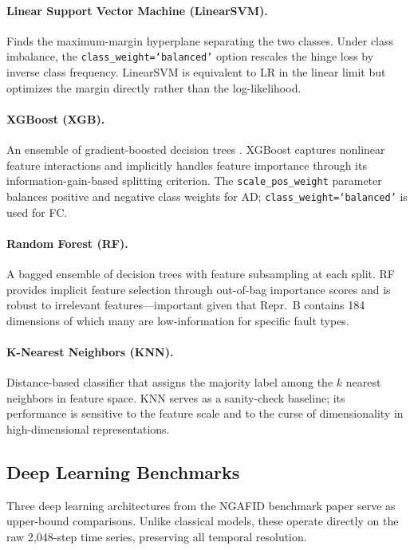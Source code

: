 \paragraph{Linear Support Vector Machine (LinearSVM).}
Finds the maximum-margin hyperplane separating the two classes. Under class
imbalance, the \texttt{class\_weight=`balanced'} option rescales the hinge loss
by inverse class frequency. LinearSVM is equivalent to LR in the linear limit but
optimizes the margin directly rather than the log-likelihood.

\paragraph{XGBoost (XGB).}
An ensemble of gradient-boosted decision trees \cite{xgboost2016}. XGBoost
captures nonlinear feature interactions and implicitly handles feature
importance through its information-gain-based splitting criterion. The
\texttt{scale\_pos\_weight} parameter balances positive and negative class
weights for AD; \texttt{class\_weight=`balanced'} is used for FC.

\paragraph{Random Forest (RF).}
A bagged ensemble of decision trees with feature subsampling at each split.
RF provides implicit feature selection through out-of-bag importance scores
and is robust to irrelevant features---important given that Repr.~B contains
184 dimensions of which many are low-information for specific fault types.

\paragraph{K-Nearest Neighbors (KNN).}
Distance-based classifier that assigns the majority label among the $k$ nearest
neighbors in feature space. KNN serves as a sanity-check baseline; its
performance is sensitive to the feature scale and to the curse of dimensionality
in high-dimensional representations.

\subsection{Deep Learning Benchmarks}
\label{subsec:dl}

Three deep learning architectures from the NGAFID benchmark paper
\cite{convtok2023, lmsd2025} serve as upper-bound comparisons. Unlike
classical models, these operate directly on the raw 2{,}048-step time series,
preserving all temporal resolution.

